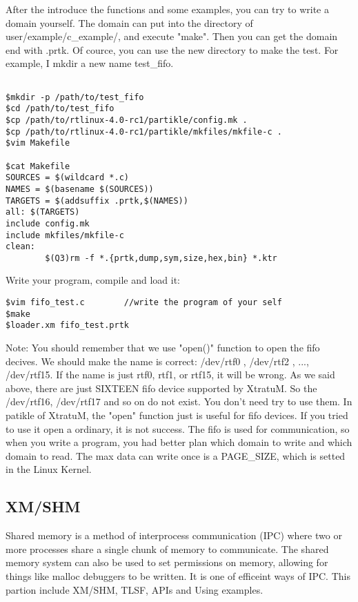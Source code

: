 After the introduce the functions and some examples, you can try to write a domain yourself. The domain can put into the directory of user/example/c\_example/, and execute "make". Then you can get the domain end with .prtk. Of cource, you can use the new directory to make the test. For example, I mkdir a new name test\_fifo.
\begin{lstlisting}

$mkdir -p /path/to/test_fifo
$cd /path/to/test_fifo
$cp /path/to/rtlinux-4.0-rc1/partikle/config.mk .
$cp /path/to/rtlinux-4.0-rc1/partikle/mkfiles/mkfile-c .
$vim Makefile

$cat Makefile
SOURCES = $(wildcard *.c)
NAMES = $(basename $(SOURCES))
TARGETS = $(addsuffix .prtk,$(NAMES))
all: $(TARGETS)
include config.mk
include mkfiles/mkfile-c
clean:
        $(Q3)rm -f *.{prtk,dump,sym,size,hex,bin} *.ktr
\end{lstlisting}
Write your program, compile and load it:

\begin{verbatim}
$vim fifo_test.c        //write the program of your self
$make 
$loader.xm fifo_test.prtk
\end{verbatim}
Note: You should remember that we use "open()" function to open the fifo decives. We should make the name is correct: 
/dev/rtf0 , /dev/rtf2 , ..., /dev/rtf15. If the name is just rtf0, rtf1, or rtf15, it will be wrong. As we said above, 
there are just SIXTEEN fifo device supported by XtratuM. So the /dev/rtf16, /dev/rtf17 and so on do not exist. You don't need try to use them. In patikle of XtratuM, the "open" function just is useful for fifo devices. If you tried to use it open a ordinary, it is not success.
The fifo is used for communication, so when you write a program, you had better plan which domain to write and which domain to read. The max data can write once is a PAGE\_SIZE, which is setted in the Linux Kernel.

\subsection{XM/SHM}
Shared memory is a method of interprocess communication (IPC) where two or more processes share a single chunk of memory to communicate. The shared memory system can also be used to set permissions on memory, allowing for things like malloc debuggers to be written. It is one of efficeint ways of IPC. This partion include XM/SHM, TLSF, APIs and Using examples.
